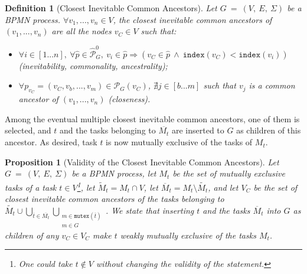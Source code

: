 \documentclass{article}
\newcommand{\acyclicisreachablefrom}[2]{#1 \xrightarrow{R_{\cancelledcirclearrow}} #2}
\newcommand{\bpmnacyclicpaths}[1]{\mathcal{\widehat{P}}_{#1}^{0}}
\newcommand{\cancelledcirclearrow}{\rotatebox[origin=c]{180}{\ensuremath{\cancel{\circlearrowright}}}}
\newcommand{\closedarray}[2]{[#1...#2]}
\newcommand{\graph}{G~=~(V,~E,~\Sigma)}
\newcommand{\indexof}[1]{\mathtt{index}(#1)}
\newcommand{\isreachablefrom}[2]{#1 \xrightarrow{R} #2}
\newcommand{\mutexesof}[1]{\ensuremath{\mathtt{mutex}(#1)}}
\newcommand{\pathsof}[2]{\mathcal{P}_{#1}(#2)}
\newcommand{\tupleof}[2]{(#1, ..., #2)}
\newtheorem{definition}{Definition}
\newtheorem{proposition}{Proposition}
\begin{document}
	\begin{definition}[Closest Inevitable Common Ancestors]
		Let $\graph$ be a BPMN process.
		$\forall v_1, ..., v_n \in V$, the \textnormal{closest inevitable common ancestors} of $(v_1, ..., v_n)$ are all the nodes $v_C \in V$ such that:
		
		\begin{itemize}
			\setlength\itemsep{-0.5em}
			\item[---] $\forall i \in \closedarray{1}{n},\ \forall \widehat{p} \in \bpmnacyclicpaths{G},\ v_i \in \widehat{p} \Rightarrow (v_C \in \widehat{p}\ \land\ \indexof{v_C} < \indexof{v_i})$ (inevitability, commonality, ancestrality);
			\item[---] $\forall p_{v_C} = (v_C, v_b, ..., v_m) \in \pathsof{G}{v_C}$, $\nexists j \in \closedarray{b}{m}$ such that $v_j$ is a common ancestor of $\tupleof{v_1}{v_n}$ (closeness).
		\end{itemize}
	\end{definition}
	
	Among the eventual multiple closest inevitable common ancestors, one of them is selected, and $t$ and the tasks belonging to $\overline{M_t}$ are inserted to $G$ as children of this ancestor.
	As desired, task $t$ is now mutually exclusive of the tasks of $M_t$.
	
	\begin{proposition}[Validity of the Closest Inevitable Common Ancestors]
		Let $\graph$ be a BPMN process, let $M_t$ be the set of mutually exclusive tasks of a task $t \in V$\footnote{One could take $t \notin V$ without changing the validity of the statement.}, let $\tilde{M}_t = M_t \cap V$, let $\overline{M}_t = M_t \setminus \tilde{M_t}$, and let $V_C$ be the set of closest inevitable common ancestors of the tasks belonging to $\tilde{M_t} \cup \bigcup\limits_{\overline{t} \in \overline{M_t}} \bigcup\limits_{\substack{m \in \mutexesof{\overline{t}} \\ m \in G}}$.
		We state that inserting $t$ and the tasks $\overline{M}_t$ into $G$ as children of any $v_C \in V_C$ make $t$ weakly mutually exclusive of the tasks $M_t$.
	\end{proposition}
	
\end{document}
